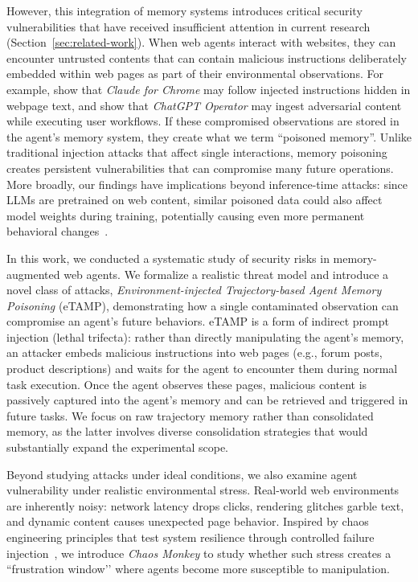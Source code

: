 \documentclass{article} %
\newcommand{\eTAMP}{eTAMP}
\begin{document}
However, this integration of memory systems introduces critical security vulnerabilities that have received insufficient attention in current research (Section~\ref{sec:related-work}). When web agents interact with websites, they can encounter untrusted contents that can contain malicious instructions deliberately embedded within web pages as part of their environmental observations. 
For example, \citet{anthropic2025claudechrome} show that \emph{Claude for Chrome} may follow injected instructions hidden in webpage text, and \citet{wunderwuzzi2025operator} show that \emph{ChatGPT Operator} may ingest adversarial content while executing user workflows.
If these compromised observations are stored in the agent's memory system, they create what we term ``poisoned memory''. Unlike traditional injection attacks that affect single interactions, memory poisoning creates persistent vulnerabilities that can compromise many future operations. More broadly, our findings have implications beyond inference-time attacks: since LLMs are pretrained on web content, similar poisoned data could also affect model weights during training, potentially causing even more permanent behavioral changes~\citep{wang2024badagent}.

In this work, we conducted a systematic study of security risks in memory-augmented web agents. We formalize a realistic threat model and introduce a novel class of attacks, \emph{Environment-injected Trajectory-based Agent Memory Poisoning} ({\eTAMP}), demonstrating how a single contaminated observation can compromise an agent’s future behaviors. {\eTAMP} is a form of indirect prompt injection (lethal trifecta): rather than directly manipulating the agent’s memory, an attacker embeds malicious instructions into web pages (e.g., forum posts, product descriptions) and waits for the agent to encounter them during normal task execution. Once the agent observes these pages, malicious content is passively captured into the agent’s memory and can be retrieved and triggered in future tasks. We focus on raw trajectory memory rather than consolidated memory, as the latter involves diverse consolidation strategies that would substantially expand the experimental scope.

Beyond studying attacks under ideal conditions, we also examine agent vulnerability under realistic environmental stress. Real-world web environments are inherently noisy: network latency drops clicks, rendering glitches garble text, and dynamic content causes unexpected page behavior. Inspired by chaos engineering principles that test system resilience through controlled failure injection~\citep{netflixchaosmonkey}, we introduce \emph{Chaos Monkey} to study whether such stress creates a ``frustration window’’ where agents become more susceptible to manipulation.
\end{document}

